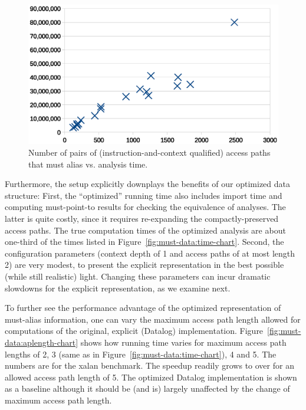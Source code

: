 \begin{figure}[htp]
\centering
\includegraphics[clip,width=\linewidth]{assets/must-data/pairs.eps}
\caption[Number of pairs of access paths vs. analysis time]{Number of pairs of (instruction-and-context qualified) access paths that must alias vs. analysis time.}
\label{fig:must-data:pairs-chart}
\end{figure}

Furthermore, the setup explicitly downplays the benefits of our optimized data structure: First, the ``optimized'' running time also includes import time and computing must-point-to results for checking the equivalence of analyses. The latter is quite costly, since it requires re-expanding the compactly-preserved access paths. The true computation times of the optimized analysis are about one-third of the times listed in Figure~\ref{fig:must-data:time-chart}. Second, the configuration parameters (context depth of 1 and access paths of at most length 2) are very modest, to present the explicit representation in the best possible (while still realistic) light. Changing these parameters can incur dramatic slowdowns for the explicit representation, as we examine next.


To further see the performance advantage of the optimized representation of must-alias information, one can vary the maximum access path length allowed for computations of the original, explicit (Datalog) implementation. Figure~\ref{fig:must-data:aplength-chart} shows how running time varies for maximum access path lengths of 2, 3 (same as in Figure~\ref{fig:must-data:time-chart}), 4 and 5. The numbers are for the xalan benchmark. The speedup readily grows to over  for an allowed access path length of 5. The optimized Datalog implementation is shown as a baseline although it should be (and is) largely unaffected by the change of maximum access path length.

